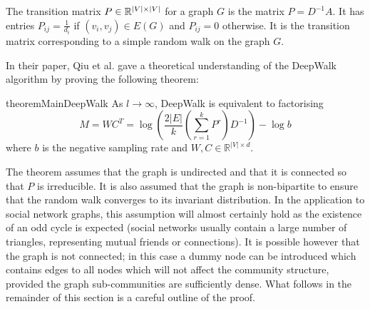 \documentclass[a4paper]{article}
\begin{document}
\begin{definition}
  The transition matrix $P \in \R^{|V| \times |V|}$ for a graph $G$ is the
  matrix $P = D^{-1}A$. It has entries $P_{ij} = \frac{1}{d_i}$ if $(v_i, v_j)
  \in E(G)$ and $P_{ij} = 0$ otherwise. It is the transition matrix
  corresponding to a simple random walk on the graph $G$. 
\end{definition}
In their paper, Qiu et al. gave a theoretical understanding of the DeepWalk
algorithm by proving the following theorem:
\begin{restatable}{theorem}{MainDeepWalk}
  As $l \to \infty$, DeepWalk is equivalent to factorising
  \[M = WC^T = \log{\left(\frac{2|E|}{k}\left( \sum_{r = 1}^k P^r  \right) D^{-1}
      \right)} - \log{b}\]
  where $b$ is the negative sampling rate and $W, C \in \mathbb{R}^{|V| \times d}$.
\end{restatable}
\noindent The theorem assumes that the graph is undirected and that it is connected so
that $P$ is irreducible. It is also assumed that the graph is
non-bipartite to ensure that the random walk converges to its invariant distribution. In the application to
social network graphs, this
assumption will almost certainly hold as the existence of an odd cycle is
expected (social networks usually contain a large number of triangles,
representing mutual friends or connections). It is possible however that the
graph is not connected; in this case a dummy node can be introduced which
contains edges to all nodes which will not affect the community structure,
provided the graph sub-communities are sufficiently dense.
What follows in the remainder of this section is a careful outline of the proof.
\end{document}
